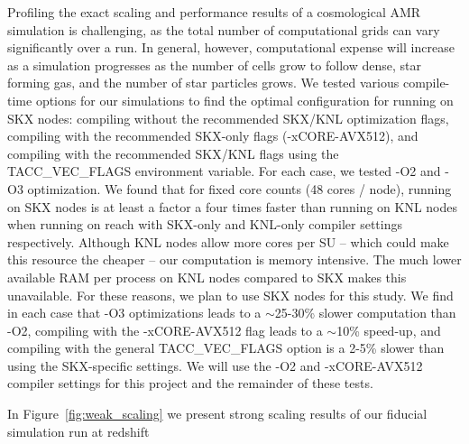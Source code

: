 \documentclass[12pt]{article} %
\begin{document}
Profiling the exact scaling and performance results of a cosmological AMR simulation is challenging, as the total number of computational grids can vary significantly over a run. In general, however, computational expense will increase as a simulation progresses as the number of cells grow to follow dense, star forming gas, and the number of star particles grows. We tested various compile-time options for our simulations to find the optimal configuration for running on SKX nodes: compiling without the recommended SKX/KNL optimization flags, compiling with the recommended SKX-only flags (-xCORE-AVX512), and compiling with the recommended SKX/KNL flags using the TACC\_VEC\_FLAGS environment variable. For each case, we tested -O2 and -O3 optimization. We found that for fixed core counts (48 cores / node), running on SKX nodes is at least a factor a four times faster than running on KNL nodes when running on reach with SKX-only and KNL-only compiler settings respectively. Although KNL nodes allow more cores per SU -- which could make this resource the cheaper -- our computation is memory intensive. The much lower available RAM per process on KNL nodes compared to SKX makes this unavailable. For these reasons, we plan to use SKX nodes for this study. We find in each case that -O3 optimizations leads to a $\sim$25-30\% slower computation than -O2, compiling with the -xCORE-AVX512 flag leads to a $\sim$10\% speed-up, and compiling with the general TACC\_VEC\_FLAGS option is a 2-5\% slower than using the SKX-specific settings. We will use the -O2 and -xCORE-AVX512 compiler settings for this project and the remainder of these tests.

In Figure~\ref{fig:weak_scaling} we present strong scaling results of our fiducial simulation run at redshift 


\def\bibfont{\footnotesize}

\end{document}
